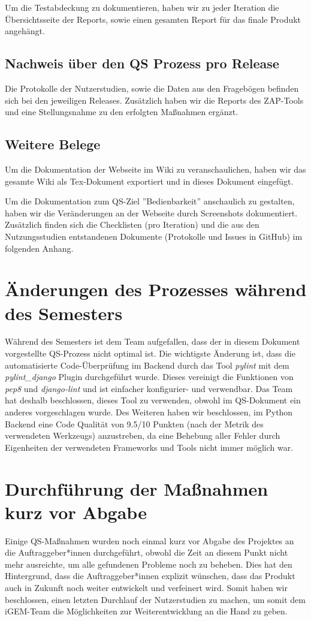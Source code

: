 \documentclass[accentcolor=tud0b,12pt,paper=a4]{tudreport}
\begin{document}
Um die Testabdeckung zu dokumentieren, haben wir zu jeder Iteration die Übersichtsseite der Reports, sowie einen gesamten Report für das finale Produkt angehängt.

\subsection{Nachweis über den QS Prozess pro Release}
Die Protokolle der Nutzerstudien, sowie die Daten aus den Fragebögen befinden sich bei den jeweiligen Releases. Zusätzlich haben wir die Reports des ZAP-Tools und eine Stellungsnahme zu den erfolgten Maßnahmen ergänzt.

\subsection{Weitere Belege}
Um die Dokumentation der Webseite im Wiki zu veranschaulichen, haben wir das gesamte Wiki als Tex-Dokument exportiert und in dieses Dokument eingefügt.

Um die Dokumentation zum QS-Ziel ''Bedienbarkeit'' anschaulich zu gestalten, haben wir die Veränderungen an der Webseite durch Screenshots dokumentiert. Zusätzlich finden sich die Checklisten (pro Iteration) und die aus den Nutzungsstudien entstandenen Dokumente (Protokolle und Issues in GitHub) im folgenden Anhang.

\section{Änderungen des Prozesses während des Semesters}
Während des Semesters ist dem Team aufgefallen, dass der in diesem Dokument vorgestellte QS-Prozess nicht optimal ist. Die wichtigste Änderung ist, dass die automatisierte Code-Überprüfung im Backend durch das Tool \emph{pylint} mit dem \emph{pylint\_django} Plugin durchgeführt wurde. Dieses vereinigt die Funktionen von \emph{pep8} und \emph{django-lint} und ist einfacher konfigurier- und verwendbar. Das Team hat deshalb beschlossen, dieses Tool zu verwenden, obwohl im QS-Dokument ein anderes vorgeschlagen wurde. Des Weiteren haben wir beschlossen, im Python Backend eine Code Qualität von 9.5/10 Punkten (nach der Metrik des verwendeten Werkzeugs) anzustreben, da eine Behebung aller Fehler durch Eigenheiten der verwendeten Frameworks und Tools nicht immer möglich war.

\section{Durchführung der Maßnahmen kurz vor Abgabe}
Einige QS-Maßnahmen wurden noch einmal kurz vor Abgabe des Projektes an die Auftraggeber*innen durchgeführt, obwohl die Zeit an diesem Punkt nicht mehr ausreichte, um alle gefundenen Probleme noch zu beheben. Dies hat den Hintergrund, dass die Auftraggeber*innen explizit wünschen, dass das Produkt auch in Zukunft noch weiter entwickelt und verfeinert wird. Somit haben wir beschlossen, einen letzten Durchlauf der Nutzerstudien zu machen, um somit dem iGEM-Team die Möglichkeiten zur Weiterentwicklung an die Hand zu geben.
\end{document}
